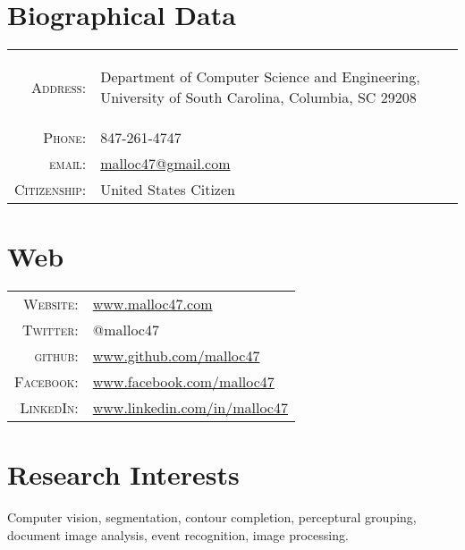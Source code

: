 \documentclass[a4paper,10pt]{article}
\begin{document}
\begin{multicols}{2}
\setlength{\parskip}{0pt}
  \section{Biographical Data}

\begin{tabular}{r p{5.2cm}}
  \textsc{Address:}	& \begin{footnotesize} Department of Computer Science and Engineering, University of South Carolina, Columbia, SC 29208 \end{footnotesize} \\
  \textsc{Phone:}       & 847-261-4747\\
  \textsc{email:}       & \href{mailto:malloc47@gmail.com}{malloc47@gmail.com} \\
  \textsc{Citizenship:} & United States Citizen \\
\end{tabular}

\vfill
\columnbreak

\section{Web}
\begin{tabular}{r p{5cm}}
  \textsc{Website:}	& \href{http://www.malloc47.com}{www.malloc47.com} \\
  \textsc{Twitter:}     & @malloc47 \\
  \textsc{github:}      & \href{http://www.github.com/malloc47}{www.github.com/malloc47}\\
  \textsc{Facebook:}    & \href{http://www.facebook.com/malloc47}{www.facebook.com/malloc47} \\
  \textsc{LinkedIn:}       & \href{http://www.linkedin.com/in/malloc47}{www.linkedin.com/in/malloc47} \\
\end{tabular}

\end{multicols}

\vspace{2em}

\section{Research Interests}

Computer vision, segmentation, contour completion, perceptural grouping, document image analysis, event recognition, image processing.
\end{document}
